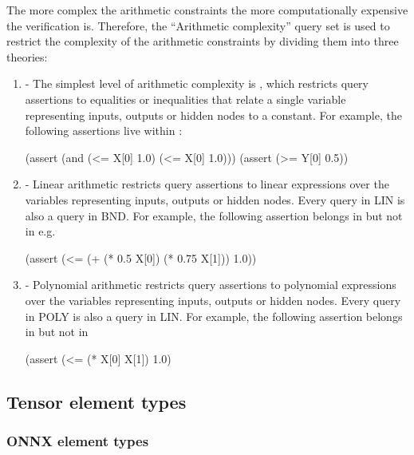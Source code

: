The more complex the arithmetic constraints the more computationally expensive the verification is. Therefore, the ``Arithmetic complexity'' query set is used to restrict the complexity of the arithmetic constraints by dividing them into three theories:

\begin{enumerate}
\item \textbf{\bnd{}} - 
The simplest level of arithmetic complexity is \bnd{}, which restricts query assertions to equalities or inequalities that relate a single variable representing 
inputs, outputs or hidden nodes to a constant. For example, the following assertions live within \bnd{}:

\begin{code}[style=lbnf]
(assert (and (<= X[0] 1.0) (<= X[0] 1.0)))
(assert (>= Y[0] 0.5))
\end{code}

\item \textbf{\lin{}} - Linear arithmetic restricts query assertions to linear expressions over the variables representing inputs, outputs or hidden nodes. Every query in LIN is also a query in BND. For example, the following assertion belongs in \lin{} but not in \bnd{} e.g. 

\begin{code}[style=lbnf]
(assert (<= (+ (* 0.5 X[0]) (* 0.75 X[1])) 1.0))
\end{code}

\item \textbf{\poly{}} - Polynomial arithmetic restricts query assertions to polynomial expressions over the variables representing inputs, outputs or hidden nodes. 
Every query in POLY is also a query in LIN.
For example, the following assertion belongs in \poly{} but not in \lin{}

\begin{code}[style=lbnf]
(assert (<= (* X[0] X[1]) 1.0)
\end{code}

\end{enumerate}


\subsection{Tensor element types}
\label{sec:element-types}

\subsubsection{ONNX element types}

